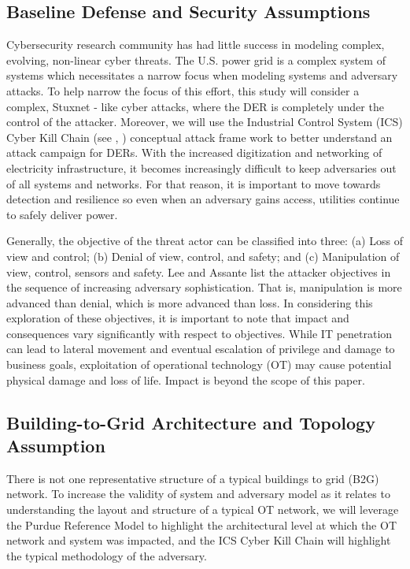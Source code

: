 \documentclass[conference]{IEEEtran}
\begin{document}
\subsection{Baseline Defense and Security Assumptions}
Cybersecurity research community has had little success in modeling complex, evolving, non-linear cyber threats. The U.S. power grid is a complex system of systems which necessitates a narrow focus when modeling systems and adversary attacks. To help narrow the focus of this effort, this study will consider a complex, Stuxnet - like cyber attacks, where the DER is completely under the control of the attacker. Moreover, we will use the  Industrial Control System (ICS) Cyber Kill Chain (see \cite{Kushner:2013}, \cite{LeeAssante:2015}) conceptual attack frame work to better understand an attack campaign for DERs. With the increased digitization and networking of electricity infrastructure, it becomes increasingly difficult to keep adversaries out of all systems and networks. For that reason, it is important to move towards detection and resilience so even when an adversary gains access,  utilities continue to safely deliver power. 

Generally, the objective of the threat actor can be classified into three:  (a) Loss of view and control; (b) Denial of view, control, and safety; and (c) Manipulation of view, control, sensors and safety. Lee and Assante \cite{LeeAssante:2015} list the attacker objectives in the  sequence of increasing adversary sophistication. That is, manipulation is more advanced than denial, which is more advanced than loss. In considering this exploration of these objectives, it is important to note that impact and consequences vary significantly with respect to objectives. While IT penetration can lead to lateral movement and eventual escalation of privilege and damage to business goals, exploitation of operational technology (OT) may cause potential physical damage and loss of life. Impact is beyond the scope of this paper.

\subsection{Building-to-Grid Architecture and Topology Assumption}
There is not one representative structure of a typical buildings to grid (B2G) network. To increase the validity of system and adversary model as it relates to understanding the layout and structure of a typical OT network, we will leverage the Purdue Reference Model to highlight the architectural level at which the OT network and system was impacted, and the ICS Cyber Kill Chain will highlight the typical methodology of the adversary. 
\end{document}
